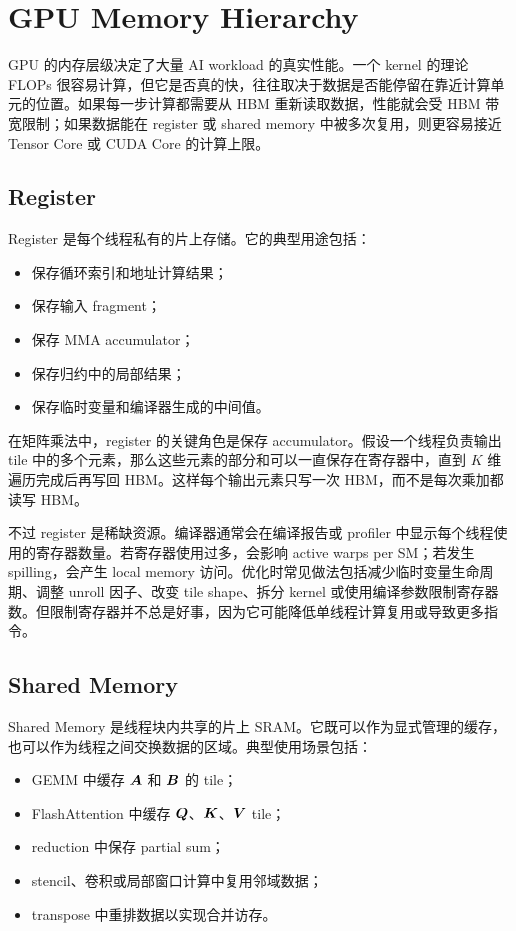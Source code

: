 \section{GPU Memory Hierarchy}
\label{sec:gpu-memory-hierarchy}

GPU 的内存层级决定了大量 AI workload 的真实性能。一个 kernel 的理论 FLOPs 很容易计算，但它是否真的快，往往取决于数据是否能停留在靠近计算单元的位置。如果每一步计算都需要从 HBM 重新读取数据，性能就会受 HBM 带宽限制；如果数据能在 register 或 shared memory 中被多次复用，则更容易接近 Tensor Core 或 CUDA Core 的计算上限。

\subsection{Register}
\label{subsec:memory-register}

Register 是每个线程私有的片上存储。它的典型用途包括：

\begin{itemize}
  \item 保存循环索引和地址计算结果；
  \item 保存输入 fragment；
  \item 保存 MMA accumulator；
  \item 保存归约中的局部结果；
  \item 保存临时变量和编译器生成的中间值。
\end{itemize}

在矩阵乘法中，register 的关键角色是保存 accumulator。假设一个线程负责输出 tile 中的多个元素，那么这些元素的部分和可以一直保存在寄存器中，直到 $K$ 维遍历完成后再写回 HBM。这样每个输出元素只写一次 HBM，而不是每次乘加都读写 HBM。

不过 register 是稀缺资源。编译器通常会在编译报告或 profiler 中显示每个线程使用的寄存器数量。若寄存器使用过多，会影响 active warps per SM；若发生 spilling，会产生 local memory 访问。优化时常见做法包括减少临时变量生命周期、调整 unroll 因子、改变 tile shape、拆分 kernel 或使用编译参数限制寄存器数。但限制寄存器并不总是好事，因为它可能降低单线程计算复用或导致更多指令。

\subsection{Shared Memory}
\label{subsec:memory-shared}

Shared Memory 是线程块内共享的片上 SRAM。它既可以作为显式管理的缓存，也可以作为线程之间交换数据的区域。典型使用场景包括：

\begin{itemize}
  \item GEMM 中缓存 $\bm{A}$ 和 $\bm{B}$ 的 tile；
  \item FlashAttention 中缓存 $\bm{Q}$、$\bm{K}$、$\bm{V}$ tile；
  \item reduction 中保存 partial sum；
  \item stencil、卷积或局部窗口计算中复用邻域数据；
  \item transpose 中重排数据以实现合并访存。
\end{itemize}

